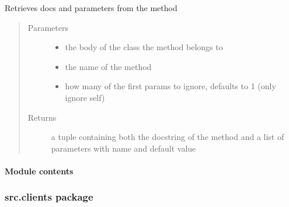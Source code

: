 \documentclass[letterpaper,10pt,english]{sphinxmanual}
\begin{document}
\begin{fulllineitems}
\label{\detokenize{src.blueprints:src.blueprints.views.retrieve_method_info}}
Retrieves docs and parameters from the method
\begin{quote}\begin{description}
\item[{Parameters}] \leavevmode\begin{itemize}
\item {} 
 \textendash{} the body of the class the method belongs to

\item {} 
 \textendash{} the name of the method

\item {} 
 \textendash{} how many of the first params to ignore, defaults to 1 (only ignore self)

\end{itemize}

\item[{Returns}] \leavevmode
a tuple containing both the docstring of the method and a list of parameters with name and default value

\end{description}\end{quote}

\end{fulllineitems}



\paragraph{Module contents}
\label{\detokenize{src.blueprints:module-src.blueprints}}\label{\detokenize{src.blueprints:module-contents}}

\subsubsection{src.clients package}
\label{\detokenize{src.clients:src-clients-package}}\label{\detokenize{src.clients::doc}}
\end{document}
